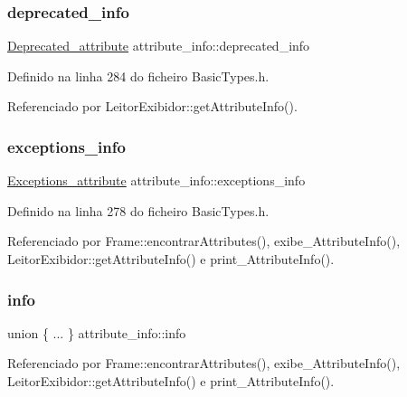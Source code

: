 \subsubsection{\texorpdfstring{deprecated\+\_\+info}{deprecated\_info}}
{\footnotesize\ttfamily \hyperlink{structDeprecated__attribute}{Deprecated\+\_\+attribute} attribute\+\_\+info\+::deprecated\+\_\+info}



Definido na linha 284 do ficheiro Basic\+Types.\+h.



Referenciado por Leitor\+Exibidor\+::get\+Attribute\+Info().

\mbox{\label{structattribute__info_a244c271949354ebd402f9330cb02b062}} 
\subsubsection{\texorpdfstring{exceptions\+\_\+info}{exceptions\_info}}
{\footnotesize\ttfamily \hyperlink{structExceptions__attribute}{Exceptions\+\_\+attribute} attribute\+\_\+info\+::exceptions\+\_\+info}



Definido na linha 278 do ficheiro Basic\+Types.\+h.



Referenciado por Frame\+::encontrar\+Attributes(), exibe\+\_\+\+Attribute\+Info(), Leitor\+Exibidor\+::get\+Attribute\+Info() e print\+\_\+\+Attribute\+Info().

\mbox{\label{structattribute__info_a5ce6e5e84e84941dfa2bab1322be6dcf}} 
\subsubsection{\texorpdfstring{info}{info}}
{\footnotesize\ttfamily union \{ ... \}   attribute\+\_\+info\+::info}



Referenciado por Frame\+::encontrar\+Attributes(), exibe\+\_\+\+Attribute\+Info(), Leitor\+Exibidor\+::get\+Attribute\+Info() e print\+\_\+\+Attribute\+Info().

